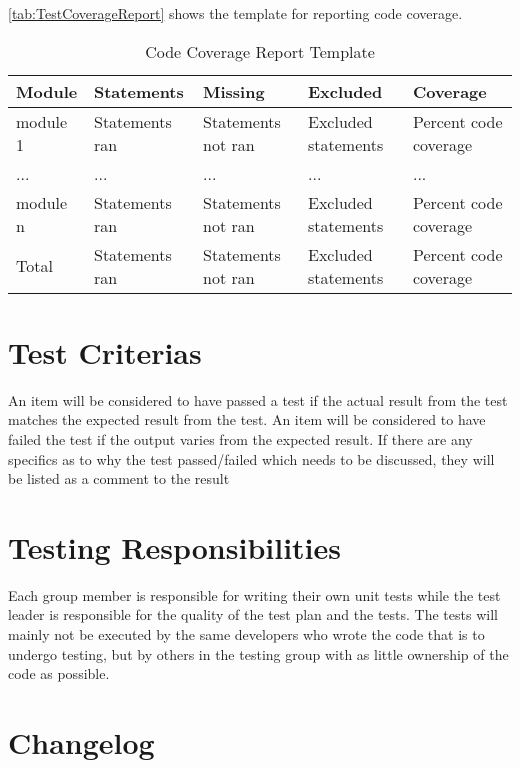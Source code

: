 \autoref{tab:TestCoverageReport} shows the template for reporting code coverage.

\begin{table}[!htb]\footnotesize\center
	\caption{Code Coverage Report Template\label{tab:TestCoverageReport}}
	\begin{tabular}{l l l l l}
		\toprule
		Module & Statements & Missing & Excluded & Coverage\\
		\midrule
		module 1 & Statements ran & Statements not ran  & Excluded statements & Percent code coverage\ \\
		... & ... & ... & ... & ... \\
		module n & Statements ran & Statements not ran & Excluded statements  & Percent code coverage \\
		\bottomrule
		Total & Statements ran & Statements not ran & Excluded statements & Percent code coverage \\
		\bottomrule
	\end{tabular}
\end{table}


\section{Test Criterias}
An item will be considered to have passed a test if the actual result from the test matches the expected result from the test. An item will be considered to have failed the test if the output varies from the expected result. If there are any specifics as to why the test passed/failed which needs to be discussed, they will be listed as a comment to the result


\section{Testing Responsibilities}
Each group member is responsible for writing their own unit tests while the test leader is responsible for the quality of the test plan and the tests. The tests will mainly not be executed by the same developers who wrote the code that is to undergo testing, but by others in the testing group with as little ownership of the code as possible. 

\section{Changelog}

